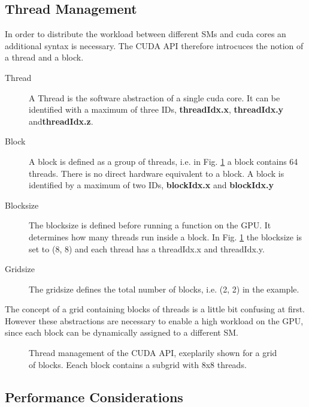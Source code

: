 \clearpage

\subsection{Thread Management}
\label{cuda:sec_threadmanage}

In order to distribute the workload between different SMs and cuda cores an additional syntax is necessary.
The CUDA API therefore  introcuces the notion of a thread and a block.

\begin{description}
    \item[Thread] A Thread is the software abstraction of a single cuda core. It can be identified with
                   a maximum of three IDs, \textbf{threadIdx.x}, \textbf{threadIdx.y} and\textbf{threadIdx.z}.

    \item[Block] A block is defined as a group of threads, i.e. in Fig. \ref{cuda:grid_example} a block contains 64 threads.
                 There  is no direct hardware equivalent to a block.
                 A block is identified by a maximum of two IDs, \textbf{blockIdx.x} and \textbf{blockIdx.y}

    \item[Blocksize] The blocksize is defined before running a function on the GPU. It determines how
                    many threads run inside a block. In Fig. \ref{cuda:grid_example} the blocksize is set to (8, 8) and
                    each thread has a threadIdx.x and threadIdx.y.

    \item[Gridsize] The gridsize defines the total number of blocks, i.e. (2, 2) in the example.
\end{description}

The concept of a grid containing blocks of threads is a little bit confusing at first.
However these abstractions are necessary to enable a high workload on the GPU,
since each block can be dynamically assigned to a different SM.


\begin{figure}[!bp]
      \centering
       \caption{Thread management of the CUDA API, exeplarily shown for a
        grid of blocks.  Eeach block contains a subgrid with 8x8 threads.}
       \label{cuda:grid_example}
\end{figure}


\subsection{Performance Considerations}

